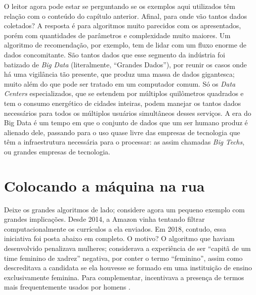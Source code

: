 O leitor agora pode estar se perguntando se os exemplos aqui utilizados têm relação com o conteúdo do capítulo anterior.
Afinal, para onde vão tantos dados coletados?
A resposta é para algoritmos muito parecidos com os apresentados, porém com quantidades de parâmetros e complexidade muito maiores.
Um algoritmo de recomendação, por exemplo, tem de lidar com um fluxo enorme de dados concomitante.
São tantos dados que esse segmento da indústria foi batizado de \textit{Big Data} (literalmente, ``Grandes Dados''), por reunir os casos onde há uma vigilância tão presente, que produz uma massa de dados gigantesca; muito além do que pode ser tratado em um computador comum.
Só os \textit{Data Centers} especializados, que se estendem por múltiplos quilômetros quadrados e tem o consumo energético de cidades inteiras, podem manejar os tantos dados necessários para todos os múltiplos usuários simultâneos desses serviços.
A era do Big Data é um tempo em que o conjunto de dados que um ser humano produz é alienado dele, passando para o uso quase livre das empresas de tecnologia que têm a infraestrutura necessária para o processar: as assim chamadas \textit{Big Techs}, ou grandes empresas de tecnologia.

\section{Colocando a máquina na rua}\label{sec:2:exemplo-real}
Deixe os grandes algoritmos de lado; considere agora um pequeno exemplo com grandes implicações.
Desde 2014, a Amazon vinha tentando filtrar computacionalmente os currículos a ela enviados.
Em 2018, contudo, essa iniciativa foi posta abaixo em completo.
O motivo?
O algoritmo que haviam desenvolvido penalizava mulheres; considerava a experiência de ser ``capitã de um time feminino de xadrez'' negativa, por conter o termo ``feminino'', assim como descreditava a candidata se ela houvesse se formado em uma instituição de ensino exclusivamente feminina.
Para complementar, incentivava a presença de termos mais frequentemente usados por homens \cite{dastin_amazon_2018}.

